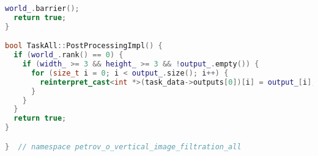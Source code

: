 \documentclass[12pt,a4paper]{extarticle}
\begin{document}
\begin{lstlisting}[language=C++]
  world_.barrier();
  return true;
}

bool TaskAll::PostProcessingImpl() {
  if (world_.rank() == 0) {
    if (width_ >= 3 && height_ >= 3 && !output_.empty()) {
      for (size_t i = 0; i < output_.size(); i++) {
        reinterpret_cast<int *>(task_data->outputs[0])[i] = output_[i];
      }
    }
  }
  return true;
}

}  // namespace petrov_o_vertical_image_filtration_all
\end{lstlisting}
\end{document}

